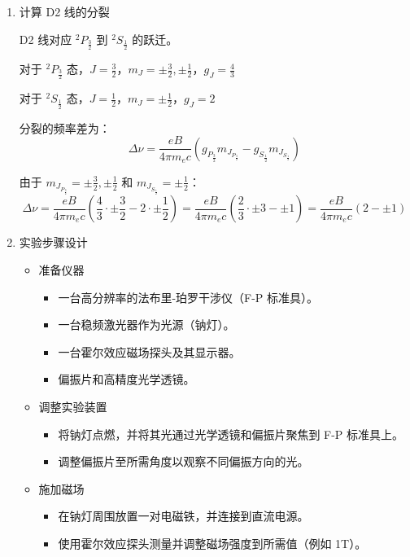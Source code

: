 \documentclass[dvipsnames, svgnames,a4paper,11pt]{article}
\begin{document}
\begin{enumerate}
		由于 $$m_{J_{P_{\frac{1}{2}}}} = \pm \frac{1}{2}$$ 和 $m_{J_{S_{\frac{1}{2}}}} = \pm \frac{1}{2}$：
		\[
		\Delta \nu = \frac{e B}{4 \pi m_e c} \left( \frac{2}{3} \cdot \pm \frac{1}{2} - 2 \cdot \pm \frac{1}{2} \right) = \frac{e B}{4 \pi m_e c} \cdot \frac{1}{6}
		\]
		
		\item 计算 D2 线的分裂
		
		D2 线对应 $^2P_{\frac{3}{2}}$ 到 $^2S_{\frac{1}{2}}$ 的跃迁。
		
		对于 $^2P_{\frac{3}{2}}$ 态，$J = \frac{3}{2}$，$m_J = \pm \frac{3}{2}, \pm \frac{1}{2}$，$g_J = \frac{4}{3}$
		
		对于 $^2S_{\frac{1}{2}}$ 态，$J = \frac{1}{2}$，$m_J = \pm \frac{1}{2}$，$g_J = 2$
		
		分裂的频率差为：
		\[
		\Delta \nu = \frac{e B}{4 \pi m_e c} \left( g_{P_{\frac{3}{2}}} m_{J_{P_{\frac{3}{2}}}} - g_{S_{\frac{1}{2}}} m_{J_{S_{\frac{1}{2}}}} \right)
		\]
		
		由于 $m_{J_{P_{\frac{3}{2}}}} = \pm \frac{3}{2}, \pm \frac{1}{2}$ 和 $m_{J_{S_{\frac{1}{2}}}} = \pm \frac{1}{2}$：
		\[
		\Delta \nu = \frac{e B}{4 \pi m_e c} \left( \frac{4}{3} \cdot \pm \frac{3}{2} - 2 \cdot \pm \frac{1}{2} \right) = \frac{e B}{4 \pi m_e c} \left( \frac{2}{3} \cdot \pm 3 - \pm 1 \right) = \frac{e B}{4 \pi m_e c} \left( 2 - \pm 1 \right)
		\]
		
		\item 实验步骤设计
		\begin{itemize}
			\item 准备仪器
			\begin{itemize}
				\item 一台高分辨率的法布里-珀罗干涉仪（F-P 标准具）。
				\item 一台稳频激光器作为光源（钠灯）。
				\item 一台霍尔效应磁场探头及其显示器。
				\item 偏振片和高精度光学透镜。
			\end{itemize}
			
			\item 调整实验装置
			\begin{itemize}
				\item 将钠灯点燃，并将其光通过光学透镜和偏振片聚焦到 F-P 标准具上。
				\item 调整偏振片至所需角度以观察不同偏振方向的光。
			\end{itemize}
			
			\item 施加磁场
			\begin{itemize}
				\item 在钠灯周围放置一对电磁铁，并连接到直流电源。
				\item 使用霍尔效应探头测量并调整磁场强度到所需值（例如 1T）。
			\end{itemize}
			

\end{itemize}
\end{enumerate}
\end{document}
